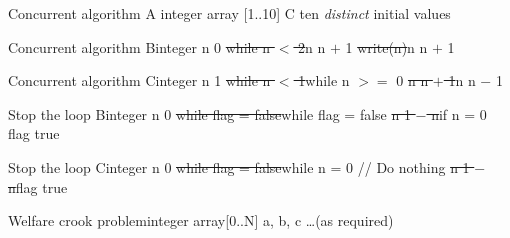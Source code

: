 \begin{wideslide}[bm=,toc=]{\large }
\begin{alg}{Concurrent algorithm A}{%
integer array [1..10] C \la{} ten {\itshape distinct} initial values}
\hline
{}
\end{alg}
\end{wideslide}

\begin{wideslide}[bm=,toc=]{\large }
\begin{alg}{Concurrent algorithm B}{integer n \la{} 0}\hline
{}
\st{while n $<$ 2}{n \la{} n $+$ 1}
\st{\idt{}write(n)}{n \la{} n $+$ 1}
\end{alg}
\end{wideslide}

\begin{wideslide}[bm=,toc=]{\large }
\begin{alg}{Concurrent algorithm C}{integer n \la{} 1}\hline
{}
\st{while n $<$ 1}{while n $>=$ 0}
\st{\idt{}n \la{} n $+$ 1}{\idt{}n \la{} n $-$ 1}
\end{alg}
\end{wideslide}

\begin{wideslide}[bm=,toc=]{\large }
\begin{alg}{Stop the loop B}{integer n \la{} 0}
\hline
{}
\st{while flag = false}{while flag = false}
\st{\idt{}n \la{} 1 $-$ n}{\idt{}if n = 0}
\st{}{\idt{}\idt{}flag \la{} true}
\end{alg}
\end{wideslide}

\begin{wideslide}[bm=,toc=]{\large }
\begin{alg}{Stop the loop C}{integer n \la{} 0}
\hline
{}
\st{while flag = false}{while n = 0 // Do nothing}
\st{\idt{}n \la{} 1 $-$ n}{flag \la{} true}
\end{alg}
\end{wideslide}

\begin{wideslide}[bm=,toc=]{\large }
\begin{alg}{Welfare crook problem}{integer array[0..N] a, b, c \la{} \ldots (as required)}
\hline
{}
\end{alg}
\end{wideslide}
